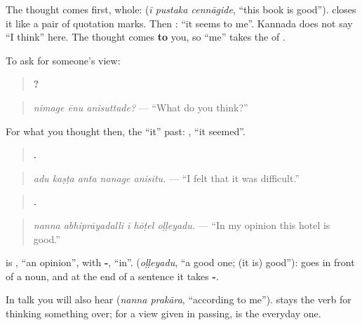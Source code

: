 The thought comes first, whole: \textbf{  } (\emph{ī pustaka cennāgide}, \textquotedblleft{}this book is good\textquotedblright{}). \textbf{} closes it like a pair of quotation marks. Then \textbf{ }: \textquotedblleft{}it seems to me\textquotedblright{}. Kannada does not say \textquotedblleft{}I think\textquotedblright{} here. The thought comes \textbf{to} you, so \textquotedblleft{}me\textquotedblright{} takes the \textbf{} of \textbf{  }.

To ask for someone's view:

\begin{quote}
\textbf{  ?}
\end{quote}

\begin{quote}
\emph{nimage ēnu anisuttade?} — \textquotedblleft{}What do you think?\textquotedblright{}
\end{quote}

For what you thought then, the \textquotedblleft{}it\textquotedblright{} past: \textbf{}, \textquotedblleft{}it seemed\textquotedblright{}.

\begin{quote}
\textbf{    .}
\end{quote}

\begin{quote}
\emph{adu kaṣṭa anta nanage anisitu.} — \textquotedblleft{}I felt that it was difficult.\textquotedblright{}
\end{quote}

\begin{grammarlens}[title={Grammar Lens: \kn{ನನ್ನ} \kn{ಅಭಿಪ್ರಾಯದಲ್ಲಿ}, in my opinion}]
\begin{quote}
\textbf{    .}
\end{quote}

\begin{quote}
\emph{nanna abhiprāyadalli ī hōṭel oḷḷeyadu.} — \textquotedblleft{}In my opinion this hotel is good.\textquotedblright{}
\end{quote}

\textbf{} is \textbf{}, \textquotedblleft{}an opinion\textquotedblright{}, with \textbf{-}, \textquotedblleft{}in\textquotedblright{}. \textbf{} (\emph{oḷḷeyadu}, \textquotedblleft{}a good one; (it is) good\textquotedblright{}): \textbf{} goes in front of a noun, and at the end of a sentence it takes \textbf{-}.

In talk you will also hear \textbf{ } (\emph{nanna prakāra}, \textquotedblleft{}according to me\textquotedblright{}). \textbf{} stays the verb for thinking something over; for a view given in passing, \textbf{} is the everyday one.
\end{grammarlens}

